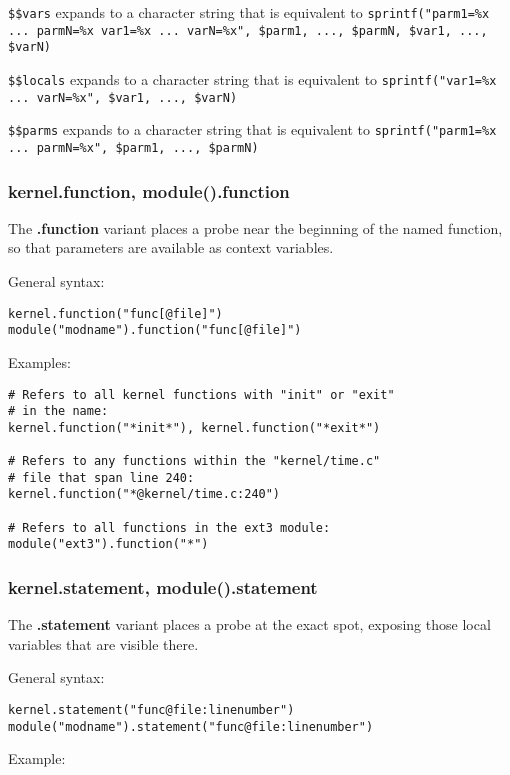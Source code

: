\documentclass[twoside,english]{article}
\newenvironment{vindent}
{\begin{list}{}{\setlength{\listparindent}{6pt}}
\item[]}
{\end{list}}
\begin{document}
\texttt{\$\$vars} expands to a character string that is equivalent to
\texttt{sprintf("parm1=\%x ... parmN=\%x var1=\%x ... varN=\%x", \$parm1, ..., \$parmN,
\$var1, ..., \$varN)}

\texttt{\$\$locals} expands to a character string that is equivalent to
\texttt{sprintf("var1=\%x ... varN=\%x", \$var1, ..., \$varN)}

\texttt{\$\$parms} expands to a character string that is equivalent to
\texttt{sprintf("parm1=\%x ... parmN=\%x", \$parm1, ..., \$parmN)}


\subsubsection{kernel.function, module().function}
The \textbf{.function} variant places a probe near the beginning of the named function,
so that parameters are available as context variables.

General syntax:

\begin{vindent}
\begin{verbatim}
kernel.function("func[@file]")
module("modname").function("func[@file]")
\end{verbatim}
\end{vindent}
Examples:

\begin{vindent}
\begin{verbatim}
# Refers to all kernel functions with "init" or "exit"
# in the name:
kernel.function("*init*"), kernel.function("*exit*")

# Refers to any functions within the "kernel/time.c"
# file that span line 240:
kernel.function("*@kernel/time.c:240")

# Refers to all functions in the ext3 module:
module("ext3").function("*")
\end{verbatim}
\end{vindent}

\subsubsection{kernel.statement, module().statement}
The \textbf{.statement} variant places a probe at the exact spot, exposing those local
variables that are visible there.

General syntax:

\begin{vindent}
\begin{verbatim}
kernel.statement("func@file:linenumber")
module("modname").statement("func@file:linenumber")
\end{verbatim}
\end{vindent}
Example:
\end{document}
